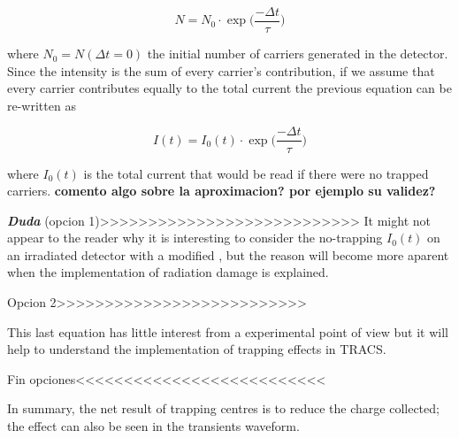 \[N = N_0 \cdot \exp{\big(\frac{-\Delta t}{\tau}} \big)\]

where $N_0 = N(\Delta t = 0)$ the initial number of carriers generated in the detector. Since the intensity is the sum of every carrier's contribution, if we assume that every carrier contributes equally to the total current the previous equation can be re-written as

\begin{equation}
	I(t) = I_0(t) \cdot \exp{\big(\frac{-\Delta t}{\tau}\big)}
 \label{eq:trapCurr}
\end{equation}

where $ I_{0}(t)$ is the total current that would be read if there were no trapped carriers. \textbf{comento algo sobre la aproximacion? por ejemplo su validez?}

\textbf{\emph{Duda}}
(opcion 1)>>>>>>>>>>>>>>>>>>>>>>>>>>>
It might not appear to the reader why it is interesting to consider the no-trapping $I_0(t)$ on an irradiated detector with a modified \neff, but the reason will become more aparent when the implementation of radiation damage is explained. 

Opcion 2>>>>>>>>>>>>>>>>>>>>>>>>>>

This last equation has little interest from a experimental point of view but it will help to understand the implementation of trapping effects in TRACS. 

Fin opciones<<<<<<<<<<<<<<<<<<<<<<<<<<

In summary, the net result of trapping centres is to reduce the charge collected; the effect can also be seen in the transients waveform.

